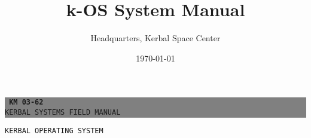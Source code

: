\documentclass[letterpaper, twoside, 10pt]{report}
\title{k-OS System Manual}
\author{Headquarters, Kerbal Space Center}
\date{\today}
\begin{document}
\begin{titlepage}
\begin{center}
		\colorbox{gray}{\begin{minipage}{6.5in}
		\begin{flushright}
		\texttt{\LARGE{\textbf{ KM\,03-62}}}\\
		\texttt{\large KERBAL SYSTEMS FIELD MANUAL}
		\vfill
		\end{flushright}
		\end{minipage}}
		\texttt{\Huge KERBAL OPERATING SYSTEM}
		\vfill
	\end{center}
\end{titlepage}


\tableofcontents











\end{document}
